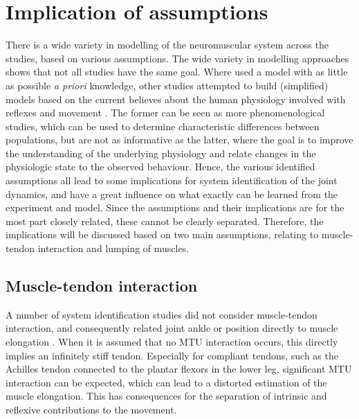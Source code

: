 \section{Implication of assumptions}
There is a wide variety in modelling of the neuromuscular system across the studies, based on various assumptions. The wide variety in modelling approaches shows that not all studies have the same goal. Where \cite{kearney_identification_1997, mirbagheri_intrinsic_2000, de_gooijer-van_de_groep_estimation_2016, jalaleddini_subspace_2017} used a model with as little as possible \textit{a priori} knowledge, other studies attempted to build (simplified) models based on the current believes about the human physiology involved with reflexes and movement \cite{zhang_simultaneous_1997, van_der_helm_identification_2002, schouten_nmclab_2008, mugge_rigorous_2010}. The former can be seen as more phenomenological studies, which can be used to determine characteristic differences between populations, but are not as informative as the latter, where the goal is to improve the understanding of the underlying physiology and relate changes in the physiologic state to the observed behaviour. Hence, the various identified assumptions all lead to some implications for system identification of the joint dynamics, and have a great influence on what exactly can be learned from the experiment and model. Since the assumptions and their implications are for the most part closely related, these cannot be clearly separated. Therefore, the implications will be discussed based on two main assumptions, relating to muscle-tendon interaction and lumping of muscles. 


\subsection{Muscle-tendon interaction}
A number of system identification studies did not consider muscle-tendon interaction, and consequently related joint ankle or position directly to muscle elongation \cite{zhang_simultaneous_1997, kearney_identification_1997, mirbagheri_intrinsic_2000, van_der_helm_identification_2002, de_gooijer-van_de_groep_estimation_2016}. When it is assumed that no MTU interaction occurs, this directly implies an infinitely stiff tendon. Especially for compliant tendons, such as the Achilles tendon connected to the plantar flexors in the lower leg, significant MTU interaction can be expected, which can lead to a distorted estimation of the muscle elongation. This has consequences for the separation of intrinsic and reflexive contributions to the movement. 

